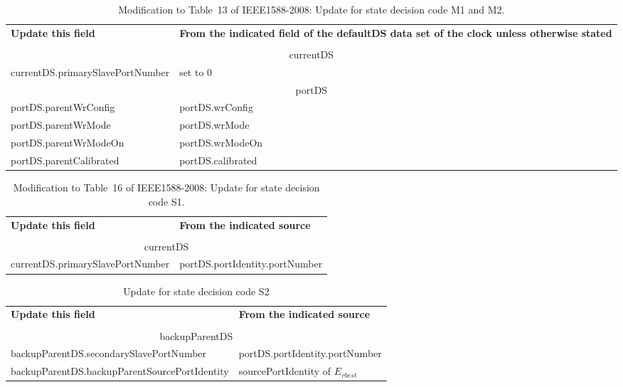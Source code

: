 \documentclass[a4paper, 12pt]{article}
\begin{document}
\begin{table}[tbp]
\caption{Modification to Table~13 of IEEE1588-2008: Update for state decision code M1 and M2.}
\centering
\begin{tabular}{| p{7.5cm} | p{7.5cm}|}           \hline
\textbf{Update this field}  		&  
\textbf{From the indicated field of the defaultDS data set of the clock unless otherwise stated} \\ 
					&  						\\ \hline
\multicolumn{2}{|c|}{currentDS}								\\ \hline
currentDS.primarySlavePortNumber   	& set to 0					\\ \hline
\multicolumn{2}{|c|}{portDS}	   	 						\\ \hline
portDS.parentWrConfig   		& portDS.wrConfig				\\ \hline
portDS.parentWrMode   			& portDS.wrMode					\\ \hline
portDS.parentWrModeOn   		& portDS.wrModeOn				\\ \hline
portDS.parentCalibrated		   	& portDS.calibrated				\\ \hline

\end{tabular}
\label{tab:modifiedM1M2}
\end{table}

\begin{table}[tbp]
\caption{Modification to Table~16 of IEEE1588-2008: Update for state decision code S1.}
\centering
\begin{tabular}{| p{7.5cm} | p{7.5cm}|}           \hline
\textbf{Update this field}  		&  \textbf{From the indicated source}  	\\ 
					&  						\\ \hline
\multicolumn{2}{|c|}{currentDS}    								\\ \hline
currentDS.primarySlavePortNumber   	& portDS.portIdentity.portNumber		\\ \hline

\end{tabular}
\label{tab:modifiedS1}
\end{table}

\begin{table}[tbp]
\caption{Update for state decision code S2}
\centering
\begin{tabular}{| p{8.5cm} | p{6.5cm}|}          \hline
\textbf{Update this field}  			&  \textbf{From the indicated source}  	\\ 
						&  					\\ \hline
\multicolumn{2}{|c|}{backupParentDS} 							\\ \hline
backupParentDS.secondarySlavePortNumber 	& portDS.portIdentity.portNumber	\\ \hline
backupParentDS.backupParentSourcePortIdentity 	& sourcePortIdentity of $E_{rbest}$	\\ \hline

\end{tabular}
\label{tab:modifiedS2}
\end{table}
\end{document}
